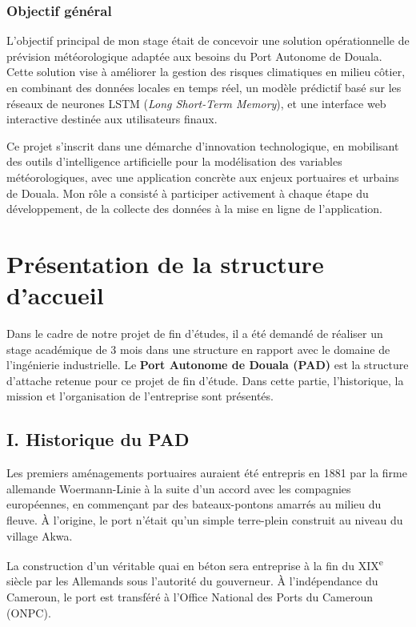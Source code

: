 \documentclass[a4paper,12pt,openany]{report}
\begin{document}
\subsection{Objectif général}

\quad L’objectif principal de mon stage était de concevoir une solution opérationnelle de prévision météorologique adaptée aux besoins du Port Autonome de Douala. Cette solution vise à améliorer la gestion des risques climatiques en milieu côtier, en combinant des données locales en temps réel, un modèle prédictif basé sur les réseaux de neurones LSTM (\textit{Long Short-Term Memory}), et une interface web interactive destinée aux utilisateurs finaux.

\quad Ce projet s’inscrit dans une démarche d’innovation technologique, en mobilisant des outils d’intelligence artificielle pour la modélisation des variables météorologiques, avec une application concrète aux enjeux portuaires et urbains de Douala. Mon rôle a consisté à participer activement à chaque étape du développement, de la collecte des données à la mise en ligne de l’application. 


	\chapter*{Présentation de la structure d’accueil}

Dans le cadre de notre projet de fin d’études, il a été demandé de réaliser un stage académique de 3 mois  dans une structure en rapport avec le domaine de l’ingénierie industrielle. Le \textbf{Port Autonome de Douala (PAD)} est la structure d’attache retenue pour ce projet de fin d’étude. Dans cette partie, l’historique, la mission et l’organisation de l’entreprise sont présentés.

\section*{I. Historique du PAD}

Les premiers aménagements portuaires auraient été entrepris en 1881 par la firme allemande Woermann-Linie à la suite d’un accord avec les compagnies européennes, en commençant par des bateaux-pontons amarrés au milieu du fleuve. À l’origine, le port n’était qu’un simple terre-plein construit au niveau du village Akwa.

La construction d’un véritable quai en béton sera entreprise à la fin du XIX\textsuperscript{e} siècle par les Allemands sous l’autorité du gouverneur. À l’indépendance du Cameroun, le port est transféré à l’Office National des Ports du Cameroun (ONPC).
\end{document}
